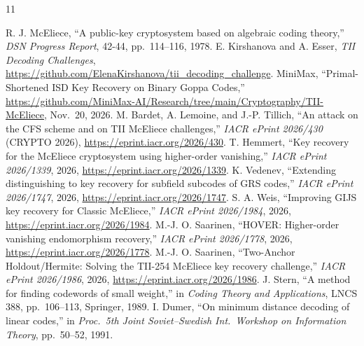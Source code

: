 \documentclass[11pt,a4paper]{article}
\begin{document}
\begin{thebibliography}{11}
\raggedright
{} R. J. McEliece, ``A public-key cryptosystem based on algebraic coding theory,'' \emph{DSN Progress Report}, 42-44, pp.~114--116, 1978.
 E. Kirshanova and A. Esser, \emph{TII Decoding Challenges}, \url{https://github.com/ElenaKirshanova/tii_decoding_challenge}.
 MiniMax, ``Primal-Shortened ISD Key Recovery on Binary Goppa Codes,'' \url{https://github.com/MiniMax-AI/Research/tree/main/Cryptography/TII-McEliece}, Nov.\ 20, 2026.
 M. Bardet, A. Lemoine, and J.-P. Tillich, ``An attack on the CFS scheme and on TII McEliece challenges,'' \emph{IACR ePrint 2026/430} (CRYPTO 2026), \url{https://eprint.iacr.org/2026/430}.
 T. Hemmert, ``Key recovery for the McEliece cryptosystem using higher-order vanishing,'' \emph{IACR ePrint 2026/1339}, 2026, \url{https://eprint.iacr.org/2026/1339}.
 K. Vedenev, ``Extending distinguishing to key recovery for subfield subcodes of GRS codes,'' \emph{IACR ePrint 2026/1747}, 2026, \url{https://eprint.iacr.org/2026/1747}.
 S. A. Weis, ``Improving GIJS key recovery for Classic McEliece,'' \emph{IACR ePrint 2026/1984}, 2026, \url{https://eprint.iacr.org/2026/1984}.
 M.-J. O. Saarinen, ``HOVER: Higher-order vanishing endomorphism recovery,'' \emph{IACR ePrint 2026/1778}, 2026, \url{https://eprint.iacr.org/2026/1778}.
 M.-J. O. Saarinen, ``Two-Anchor Holdout/Hermite: Solving the TII-254 McEliece key recovery challenge,'' \emph{IACR ePrint 2026/1986}, 2026, \url{https://eprint.iacr.org/2026/1986}.
 J. Stern, ``A method for finding codewords of small weight,'' in \emph{Coding Theory and Applications}, LNCS 388, pp.~106--113, Springer, 1989.
 I. Dumer, ``On minimum distance decoding of linear codes,'' in \emph{Proc.\ 5th Joint Soviet--Swedish Int.\ Workshop on Information Theory}, pp.~50--52, 1991.
\end{thebibliography}
\end{document}
